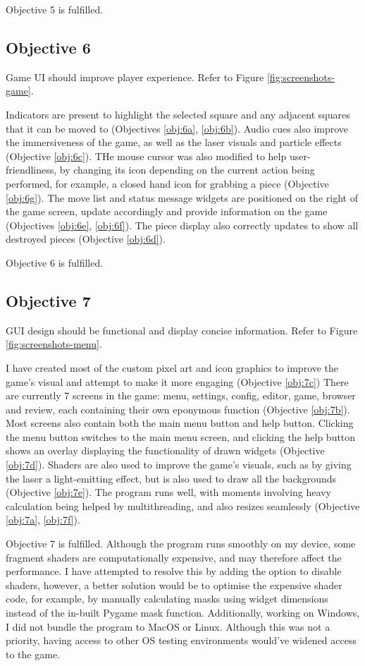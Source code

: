 \documentclass[../main/main.tex]{subfiles}
\begin{document}
Objective 5 is fulfilled.

\subsection{Objective 6}
Game UI should improve player experience. Refer to Figure \ref{fig:screenshots-game}.

Indicators are present to highlight the selected square and any adjacent squares that it can be moved to (Objectives \ref{obj:6a}, \ref{obj:6b}). Audio cues also improve the immersiveness of the game, as well as the laser visuals and particle effects (Objective \ref{obj:6c}). THe mouse cursor was also modified to help user-friendliness, by changing its icon depending on the current action being performed, for example, a closed hand icon for grabbing a piece (Objective \ref{obj:6g}). The move list and status message widgets are positioned on the right of the game screen, update accordingly and provide information on the game (Objectives \ref{obj:6e}, \ref{obj:6f}). The piece display also correctly updates to show all destroyed pieces (Objective \ref{obj:6d}).

Objective 6 is fulfilled.

\subsection{Objective 7}
GUI design should be functional and display concise information. Refer to Figure \ref{fig:screenshots-menu}.

I have created most of the custom pixel art and icon graphics to improve the game's visual and attempt to make it more engaging (Objective \ref{obj:7c}) There are currently 7 screens in the game: menu, settings, config, editor, game, browser and review, each containing their own eponymous function (Objective \ref{obj:7b}). Most screens also contain both the main menu button and help button. Clicking the menu button switches to the main menu screen, and clicking the help button shows an overlay displaying the functionality of drawn widgets (Objective \ref{obj:7d}). Shaders are also used to improve the game's visuals, such as by giving the laser a light-emitting effect, but is also used to draw all the backgrounds (Objective \ref{obj:7e}). The program runs well, with moments involving heavy calculation being helped by multithreading, and also resizes seamlessly (Objective \ref{obj:7a}, \ref{obj:7f}).

Objective 7 is fulfilled. Although the program runs smoothly on my device, some fragment shaders are computationally expensive, and may therefore affect the performance. I have attempted to resolve this by adding the option to disable shaders, however, a better solution would be to optimise the expensive shader code, for example, by manually calculating masks using widget dimensions instead of the in-built Pygame mask function. Additionally, working on Windows, I did not bundle the program to MacOS or Linux. Although this was not a priority, having access to other OS testing environments would've widened access to the game.
\end{document}

